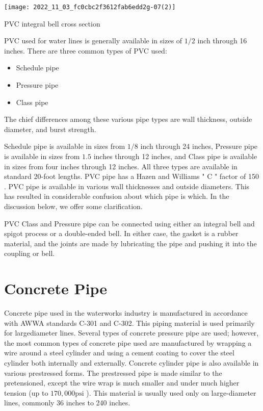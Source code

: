 \documentclass[10pt]{article}
\begin{document}
\texttt{[image: 2022\_11\_03\_fc0cbc2f3612fab6edd2g-07(2)]}

PVC integral bell cross section

PVC used for water lines is generally available in sizes of $1 / 2$ inch through 16 inches. There are three common types of PVC used:

\begin{itemize}
  \item Schedule pipe

  \item Pressure pipe

  \item Class pipe

\end{itemize}
The chief differences among these various pipe types are wall thickness, outside diameter, and burst strength.

Schedule pipe is available in sizes from $1 / 8$ inch through 24 inches, Pressure pipe is available in sizes from $1.5$ inches through 12 inches, and Class pipe is available in sizes from four inches through 12 inches. All three types are available in standard 20-foot lengths. PVC pipe has a Hazen and Williams " $\mathrm{C}$ " factor of 150 . PVC pipe is available in various wall thicknesses and outside diameters. This has resulted in considerable confusion about which pipe is which. In the discussion below, we offer some clarification.

PVC Class and Pressure pipe can be connected using either an integral bell and spigot process or a double-ended bell. In either case, the gasket is a rubber material, and the joints are made by lubricating the pipe and pushing it into the coupling or bell.

\section{Concrete Pipe}
Concrete pipe used in the waterworks industry is manufactured in accordance with AWWA standards C-301 and C-302. This piping material is used primarily for largediameter lines. Several types of concrete pressure pipe are used; however, the most common types of concrete pipe used are manufactured by wrapping a wire around a steel cylinder and using a cement coating to cover the steel cylinder both internally and externally. Concrete cylinder pipe is also available in various prestressed forms. The prestressed pipe is made similar to the pretensioned, except the wire wrap is much smaller and under much higher tension (up to $170,000 \mathrm{psi}$ ). This material is usually used only on large-diameter lines, commonly 36 inches to 240 inches.
\end{document}
